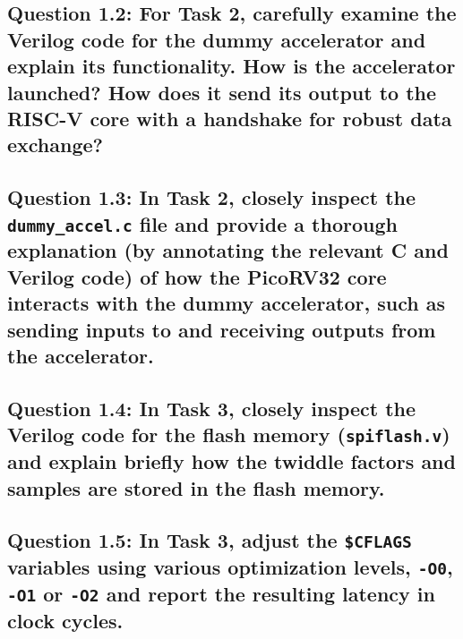 \documentclass{article}
\begin{document}
\newpage
\subsection*{Question 1.2: For Task 2, carefully examine the Verilog code for the dummy accelerator and explain its functionality. How is the accelerator launched? How does it send its output to the RISC-V core with a handshake for robust data exchange?}

\begin{tcolorbox}[colback=white, colframe=black, width=\textwidth, height=0.4\textheight, title=Answer 1.2]
\end{tcolorbox}

\subsection*{Question 1.3: In Task 2, closely inspect the \texttt{dummy\_accel.c} file and provide a thorough explanation (by annotating the relevant C and Verilog code) of how the PicoRV32 core interacts with the dummy accelerator, such as sending inputs to and receiving outputs from the accelerator.}

\begin{tcolorbox}[colback=white, colframe=black, width=\textwidth, height=0.4\textheight, title=Answer 1.3]
\end{tcolorbox}

\newpage
\subsection*{Question 1.4: In Task 3, closely inspect the Verilog code for the flash memory (\texttt{spiflash.v}) and explain briefly how the twiddle factors and samples are stored in the flash memory.}

\begin{tcolorbox}[colback=white, colframe=black, width=\textwidth, height=0.35\textheight, title=Answer 1.4]
\end{tcolorbox}

\subsection*{Question 1.5: In Task 3, adjust the \texttt{\$CFLAGS} variables using various optimization levels, \texttt{-O0}, \texttt{-O1} or \texttt{-O2} and report the resulting latency in clock cycles.}
\end{document}

